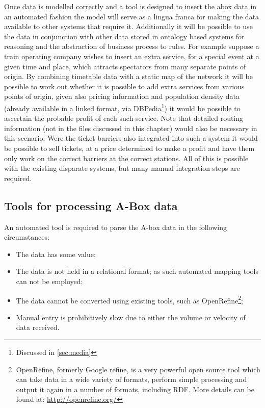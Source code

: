 Once data is modelled correctly and a tool is designed to insert the abox data in an automated fashion the model will serve as a lingua franca for making the data available to other systems that require it. Additionally it will be possible to use the data in conjunction with other data stored in ontology based systems for reasoning and the abstraction of business process to rules. For example suppose a train operating company wishes to insert an extra service, for a special event at a given time and place, which attracts spectators from many separate points of origin. By combining timetable data with a static map of the network it will be possible to work out whether it is possible to add extra services from various points of origin, given also pricing information and population density data (already available in a linked format, via DBPedia\footnote{Discussed in \autoref{sec:media}}) it would be possible to ascertain the probable profit of each such service. Note that detailed routing information (not in the files discussed in this chapter) would also be necessary in this scenario. Were the ticket barriers also integrated into such a system it would be possible to sell tickets, at a price determined to make a profit and have them only work on the correct barriers at the correct stations. All of this is possible with the existing disparate systems, but many manual integration steps are required.

\subsection{Tools for processing A-Box data}

An automated tool is required to parse the A-box data in the following circumstances:

 \begin{itemize}
 	\item The data has some value;
	\item The data is not held in a relational format; as such automated mapping tools can not be employed;
	\item The data cannot be converted using existing tools, such as OpenRefine\footnote{OpenRefine, formerly Google refine, is a very powerful open source tool which can take data in a wide variety of formats, perform simple processing and output it again in a number of formats, including RDF. More details can be found at: \url{http://openrefine.org/}};
	\item Manual entry is prohibitively slow due to either the volume or velocity of data received.
\end{itemize}

